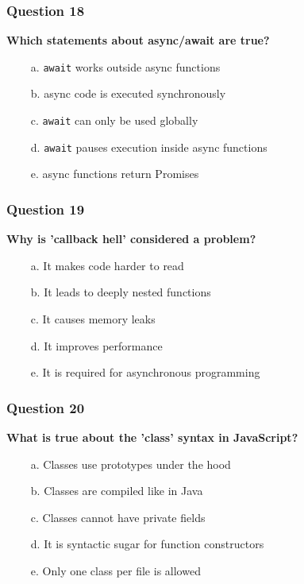 \documentclass{article}
\newcommand{\cmark}{\textcolor{green}{\ding{51}}} %
\newcommand{\xmark}{\textcolor{red}{\ding{55}}}   %
\begin{document}
\subsubsection*{Question 18}
\textbf{Which statements about async/await are true?}
\begin{itemize}
  \item[\xmark\ a.] \texttt{await} works outside async functions
  \item[\xmark\ b.] async code is executed synchronously
  \item[\xmark\ c.] \texttt{await} can only be used globally
  \item[\cmark\ d.] \texttt{await} pauses execution inside async functions
  \item[\cmark\ e.] async functions return Promises
\end{itemize}

\subsubsection*{Question 19}
\textbf{Why is 'callback hell' considered a problem?}

\begin{itemize}
  \item[\cmark\ a.] It makes code harder to read
  \item[\cmark\ b.] It leads to deeply nested functions
  \item[\xmark\ c.] It causes memory leaks
  \item[\xmark\ d.] It improves performance
  \item[\xmark\ e.] It is required for asynchronous programming
\end{itemize}

\subsubsection*{Question 20}
\textbf{What is true about the 'class' syntax in JavaScript?}

\begin{itemize}
  \item[\cmark\ a.] Classes use prototypes under the hood
  \item[\xmark\ b.] Classes are compiled like in Java
  \item[\xmark\ c.] Classes cannot have private fields
  \item[\cmark\ d.] It is syntactic sugar for function constructors
  \item[\xmark\ e.] Only one class per file is allowed
\end{itemize}
\end{document}
